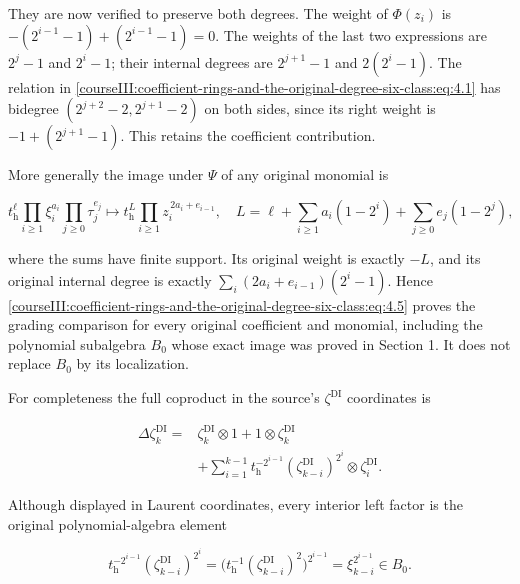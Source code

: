 They are now verified to preserve both degrees. The weight of \(\Phi(z_i)\) is
\(-(2^{i-1}-1)+(2^{i-1}-1)=0\). The weights of the last two expressions are \(2^j-1\) and \(2^i-1\); their internal degrees are \(2^{j+1}-1\) and \(2(2^i-1)\). The relation in \eqref{courseIII:coefficient-rings-and-the-original-degree-six-class:eq:4.1} has bidegree \((2^{j+2}-2,2^{j+1}-2)\) on both sides, since its right weight is \(-1+(2^{j+1}-1)\). This retains the coefficient contribution.

More generally the image under \(\Psi\) of any original monomial is

\begin{equation}
t_{\mathrm h}^{\ell}\prod_{i\geq1}\xi_i^{a_i}
                      \prod_{j\geq0}\tau_j^{e_j}
 \longmapsto
 t_{\mathrm h}^{L}\prod_{i\geq1}z_i^{\,2a_i+e_{i-1}},
 \quad
 L=\ell+\sum_{i\geq1}a_i(1-2^i)
              +\sum_{j\geq0}e_j(1-2^j),
 \label{courseIII:coefficient-rings-and-the-original-degree-six-class:eq:4.5}
\end{equation}

where the sums have finite support. Its original weight is exactly \(-L\), and its original internal degree is exactly
\(\sum_i(2a_i+e_{i-1})(2^i-1)\). Hence \eqref{courseIII:coefficient-rings-and-the-original-degree-six-class:eq:4.5} proves the grading comparison for every original coefficient and monomial, including the polynomial subalgebra \(B_0\) whose exact image was proved in Section 1. It does not replace \(B_0\) by its localization.

For completeness the full coproduct in the source's \(\zeta^{\mathrm{DI}}\) coordinates is

\begin{equation}
\begin{aligned}
 \Delta\zeta_k^{\mathrm{DI}}
  ={}&\zeta_k^{\mathrm{DI}}\otimes1+
                      1\otimes\zeta_k^{\mathrm{DI}}\\
   &+\sum_{i=1}^{k-1}
     t_{\mathrm h}^{-2^{i-1}}
       (\zeta_{k-i}^{\mathrm{DI}})^{2^i}
                         \otimes\zeta_i^{\mathrm{DI}} .
 \end{aligned}
 \label{courseIII:coefficient-rings-and-the-original-degree-six-class:eq:4.6}
\end{equation}

Although displayed in Laurent coordinates, every interior left factor is the original polynomial-algebra element

\begin{equation}
t_{\mathrm h}^{-2^{i-1}}
       (\zeta_{k-i}^{\mathrm{DI}})^{2^i}
 =\bigl(t_{\mathrm h}^{-1}
            (\zeta_{k-i}^{\mathrm{DI}})^2\bigr)^{2^{i-1}}
 =\xi_{k-i}^{2^{i-1}}\in B_0.
 \label{courseIII:coefficient-rings-and-the-original-degree-six-class:eq:4.7}
\end{equation}

